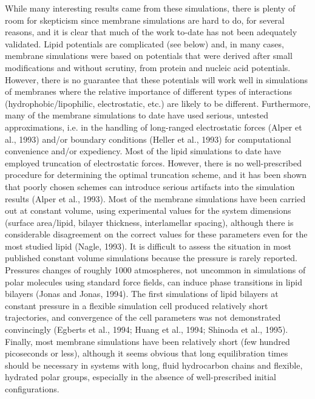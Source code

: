 While many interesting results came from these simulations,
there is plenty of room for skepticism since membrane
simulations are hard to do, for several reasons, and it
is clear that much of the work to-date has not been adequately
validated.
Lipid potentials are complicated (see below) and,
in many cases, membrane simulations were based on potentials that
were derived after small modifications and without scrutiny,
from protein and nucleic acid potentials.
However, there is no guarantee that these potentials will work well
in simulations of membranes where the relative importance of
different types of interactions (hydrophobic/lipophilic,
electrostatic, etc.) are likely to be different.
Furthermore, many of the membrane simulations to date have used serious,
untested approximations, i.e. in the handling of long-ranged electrostatic
forces (Alper et al., 1993) and/or boundary conditions (Heller et al.,
1993)
for computational convenience and/or expediency.
Most of the lipid simulations to date have employed
truncation of electrostatic forces.
However, there is no well-prescribed procedure for determining the
optimal truncation scheme, and it has been shown that
poorly chosen schemes can introduce serious artifacts into
the simulation results (Alper et al., 1993).
Most of the membrane simulations have been carried out
at constant volume,
using experimental values for the system dimensions (surface
area/lipid, bilayer thickness, interlamellar spacing), although
there is considerable disagreement on the correct values for
these parameters even for the most studied lipid (Nagle, 1993).
It is difficult to assess the situation in most published constant
volume simulations because the pressure is rarely reported.
Pressures changes of roughly 1000 atmospheres, not uncommon in
simulations of polar molecules using standard force fields,
can induce phase transitions in lipid bilayers (Jonas and Jonas, 1994).
The first simulations of lipid bilayers at constant pressure in a
flexible simulation cell produced relatively short trajectories,
and convergence of the cell parameters was not demonstrated
convincingly (Egberts et al., 1994; Huang et al., 1994; Shinoda et al.,
1995). Finally, most membrane
simulations have been relatively short (few hundred picoseconds or
less), although it seems obvious that long equilibration times
should be necessary in systems with long, fluid hydrocarbon chains
and flexible, hydrated polar groups, especially in the absence of
well-prescribed initial configurations.

